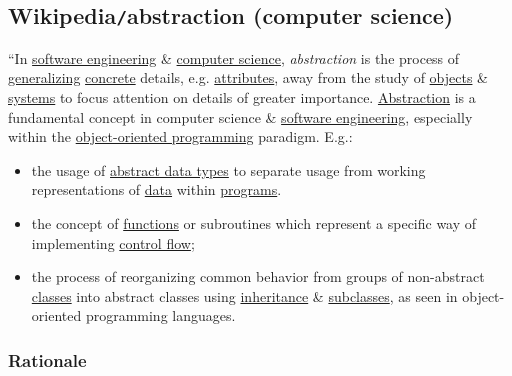 \documentclass{article}
\begin{document}
\subsection{Wikipedia{\tt/}abstraction (computer science)}
``In \href{https://en.wikipedia.org/wiki/Software_engineering}{software engineering} \& \href{https://en.wikipedia.org/wiki/Computer_science}{computer science}, {\it abstraction} is the process of \href{https://en.wikipedia.org/wiki/Generalization}{generalizing} \href{https://en.wikipedia.org/wiki/Abstract_and_concrete}{concrete} details, e.g. \href{https://en.wikipedia.org/wiki/Attribute_(computing)}{attributes}, away from the study of \href{https://en.wikipedia.org/wiki/Object_(computer_science)}{objects} \& \href{https://en.wikipedia.org/wiki/System}{systems} to focus attention on details of greater importance. \href{https://en.wikipedia.org/wiki/Abstraction}{Abstraction} is a fundamental concept in computer science \& \href{https://en.wikipedia.org/wiki/Software_engineering}{software engineering}, especially within the \href{https://en.wikipedia.org/wiki/Object-oriented_programming}{object-oriented programming} paradigm. E.g.:
\begin{itemize}
	\item the usage of \href{https://en.wikipedia.org/wiki/Abstract_data_type}{abstract data types} to separate usage from working representations of \href{https://en.wikipedia.org/wiki/Data_(computer_science)}{data} within \href{https://en.wikipedia.org/wiki/Computer_program}{programs}.
	\item the concept of \href{https://en.wikipedia.org/wiki/Procedure_(computer_science)}{functions} or subroutines which represent a specific way of implementing \href{https://en.wikipedia.org/wiki/Control_flow}{control flow};
	\item the process of reorganizing common behavior from groups of non-abstract \href{https://en.wikipedia.org/wiki/Class_(computer_programming)}{classes} into abstract classes using \href{https://en.wikipedia.org/wiki/Inheritance_(object-oriented_programming)}{inheritance} \& \href{https://en.wikipedia.org/wiki/Inheritance_(object-oriented_programming)#Subclasses_and_superclasses}{subclasses}, as seen in object-oriented programming languages.
\end{itemize}

\subsubsection{Rationale}
\end{document}
